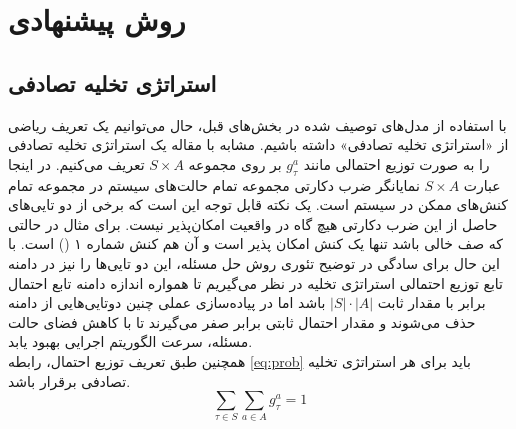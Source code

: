 \chapter{روش پیشنهادی}

\section{استراتژی تخلیه تصادفی}
با استفاده از مدل‌های توصیف شده در بخش‌های قبل، حال می‌توانیم یک تعریف ریاضی از «استراتژی تخلیه تصادفی» داشته باشیم. مشابه با مقاله \cite{Liu} یک استراتژی تخلیه تصادفی را به صورت توزیع احتمالی مانند \(g_\tau^a\) بر روی مجموعه \(S \times A\) تعریف می‌کنیم. در اینجا عبارت \(S \times A\) نمایانگر ضرب دکارتی مجموعه تمام حالت‌های سیستم در مجموعه تمام کنش‌های ممکن در سیستم است. یک نکته قابل توجه این است که برخی از دو تایی‌های حاصل از این ضرب دکارتی هیچ گاه در واقعیت امکان‌پذیر نیست. برای مثال در حالتی که صف خالی باشد تنها یک کنش امکان پذیر است و آن هم کنش شماره ۱ () است. با این حال برای سادگی در توضیح تئوری روش حل مسئله، این دو تایی‌ها را نیز در دامنه تابع توزیع احتمالی استراتژی تخلیه در نظر می‌گیریم تا همواره اندازه دامنه تابع احتمال برابر با مقدار ثابت \(|S| \cdot |A|\) باشد اما در پیاده‌سازی عملی چنین دوتایی‌هایی از دامنه حذف می‌شوند و مقدار احتمال ثابتی برابر صفر می‌گیرند تا با کاهش فضای حالت مسئله، سرعت الگوریتم اجرایی بهبود یابد. \\

همچنین طبق تعریف توزیع احتمال، رابطه \ref{eq:prob} باید برای هر استراتژی تخلیه تصادفی برقرار باشد.
\begin{equation}
	\label{eq:prob}
	\sum_{\tau \in S} \sum_{a \in A} g_{\tau}^{a}=1
\end{equation}
\newpage
